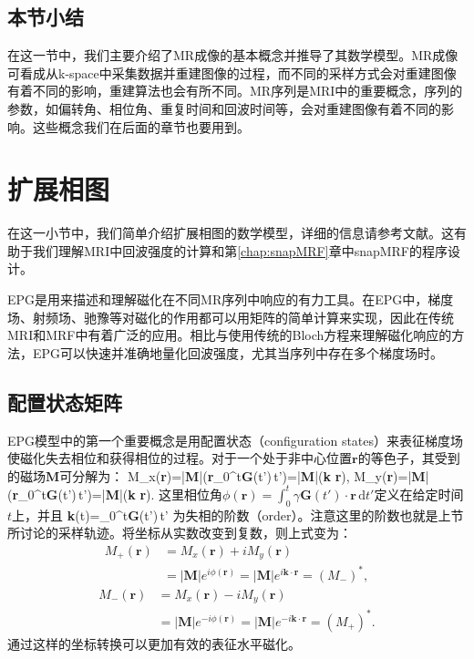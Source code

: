 \subsection{本节小结}
在这一节中，我们主要介绍了MR成像的基本概念并推导了其数学模型。MR成像可看成从k-space中采集数据并重建图像的过程，而不同的采样方式会对重建图像有着不同的影响，重建算法也会有所不同。MR序列是MRI中的重要概念，序列的参数，如偏转角、相位角、重复时间和回波时间等，会对重建图像有着不同的影响。这些概念我们在后面的章节也要用到。

\section{扩展相图}
\label{sec:epg}
在这一小节中，我们简单介绍扩展相图的数学模型，详细的信息请参考文献\cite{weigel}。这有助于我们理解MRI中回波强度的计算和第\ref{chap:snapMRF}章中snapMRF的程序设计。

EPG是用来描述和理解磁化在不同MR序列中响应的有力工具。在EPG中，梯度场、射频场、驰豫等对磁化的作用都可以用矩阵的简单计算来实现，因此在传统MRI和MRF中有着广泛的应用。相比与使用传统的Bloch方程来理解磁化响应的方法，EPG可以快速并准确地量化回波强度，尤其当序列中存在多个梯度场时。

\subsection{配置状态矩阵}
EPG模型中的第一个重要概念是用配置状态（configuration states）来表征梯度场使磁化失去相位和获得相位的过程。对于一个处于非中心位置$\textbf{r}$的等色子，其受到的磁场$\textbf{M}$可分解为：
 \beq M_x(\textbf{r})=|\textbf{M}|\cos\left(\gamma\textbf{r}\cdot\int_0^t\textbf{G}(t')\,t'\right)=|\textbf{M}|\cos(\textbf{k} \cdot \textbf{r}),\eeq
 \beq M_y(\textbf{r})=|\textbf{M}|\sin\left(\gamma\textbf{r}\cdot\int_0^t\textbf{G}(t')\,t'\right)=|\textbf{M}|\sin(\textbf{k} \cdot \textbf{r}).\eeq
这里相位角$\phi(\textbf{r})=\int_0^t\gamma\textbf{G}(t')\cdot\textbf{r}\,\mathrm{d}t'$定义在给定时间$t$上，并且
 \beq \textbf{k}(t)=\gamma\int_0^t\textbf{G}(t')\,t'\eeq
为失相的阶数（order）。注意这里的阶数也就是上节所讨论的采样轨迹。将坐标从实数改变到复数，则上式变为：
 \begin{align}
 M_+(\textbf{r})&=M_x(\textbf{r})+iM_y(\textbf{r})\nonumber\\ &=|\textbf{M}|e^{i\phi(\textbf{r})}=|\textbf{M}|e^{i\textbf{k} \cdot \textbf{r}}=(M_-)^*,
 \end{align}
 \begin{align} M_-(\textbf{r})&=M_x(\textbf{r})-iM_y(\textbf{r})\nonumber\\ &=|\textbf{M}|e^{-i\phi(\textbf{r})}=|\textbf{M}|e^{-i\textbf{k} \cdot \textbf{r}}=(M_+)^*.\end{align}
通过这样的坐标转换可以更加有效的表征水平磁化。

